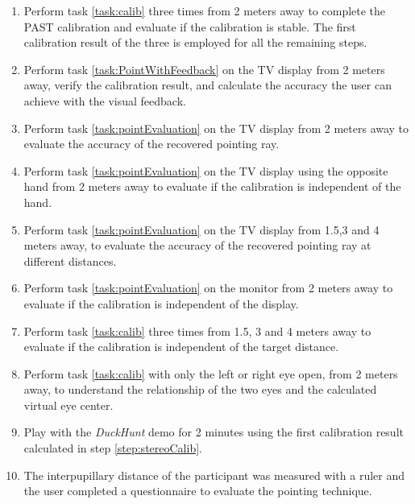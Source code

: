 \begin{enumerate}[label=(\arabic*)]
	\item \label{step:stereoCalib} Perform task \ref{task:calib} three times from 2 meters away to complete the PAST calibration and evaluate if the calibration is stable. The first calibration result of the three is employed for all the remaining steps. 
	\item \label{step:pointWithFeedback} Perform task \ref{task:PointWithFeedback} on the TV display from 2 meters away, verify the calibration result, and calculate the accuracy the user can achieve with the visual feedback. 
	\item \label{step:pointingEvaluation} Perform task \ref{task:pointEvaluation} on the TV display from 2 meters away to evaluate the accuracy of the recovered pointing ray. 
	\item \label{step:diffentHand} Perform task \ref{task:pointEvaluation} on the TV display using the opposite hand from 2 meters away to evaluate if the calibration is independent of the hand.
	\item \label{step:distanceEvaluation} Perform task \ref{task:pointEvaluation} on the TV display from 1.5,3 and 4  meters away, to evaluate the accuracy of the recovered pointing ray at different distances.
	\item \label{step:differentScreenEvaluation}  Perform task \ref{task:pointEvaluation} on the monitor from 2 meters away to evaluate if the calibration is independent of the display.
	\item \label{step:calibDifferentDistance} Perform task \ref{task:calib} three times from 1.5, 3 and 4 meters away to evaluate if the calibration is independent of the target distance. 
	\item \label{step:calibOneEye} Perform task \ref{task:calib} with only the left or right eye open, from 2 meters away, to understand the relationship of the two eyes and the calculated virtual eye center. 
	\item \label{step:pictureview} Play with the \textit{DuckHunt} demo for 2 minutes using the first calibration result calculated in step \ref{step:stereoCalib}.
	\item \label{step:questionnaire} The interpupillary distance of the participant was measured with a ruler and the user completed a questionnaire to evaluate the pointing technique.
	
\end{enumerate}
